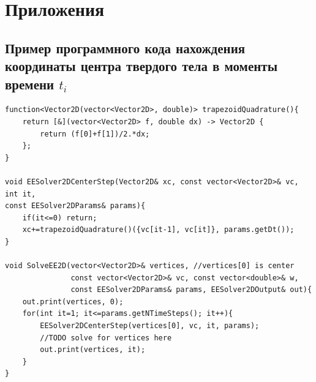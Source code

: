 \documentclass[12pt,a4paper]{article}
\begin{document}
\newpage
\section{Приложения}
\subsection{Пример программного кода нахождения координаты центра твердого тела в моменты времени $t_i$}
\label{code:xc}
\begin{lstlisting}
function<Vector2D(vector<Vector2D>, double)> trapezoidQuadrature(){
    return [&](vector<Vector2D> f, double dx) -> Vector2D {
        return (f[0]+f[1])/2.*dx;
    };
}

void EESolver2DCenterStep(Vector2D& xc, const vector<Vector2D>& vc, int it,
const EESolver2DParams& params){
    if(it<=0) return;
    xc+=trapezoidQuadrature()({vc[it-1], vc[it]}, params.getDt());
}

void SolveEE2D(vector<Vector2D>& vertices, //vertices[0] is center
               const vector<Vector2D>& vc, const vector<double>& w,
               const EESolver2DParams& params, EESolver2DOutput& out){
    out.print(vertices, 0);
    for(int it=1; it<=params.getNTimeSteps(); it++){
        EESolver2DCenterStep(vertices[0], vc, it, params);
        //TODO solve for vertices here
        out.print(vertices, it);
    }
}
\end{lstlisting}
\end{document}

